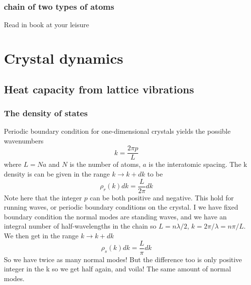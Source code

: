 \documentclass[11pt]{article}
\begin{document}
\subsubsection{chain of two types of atoms}
Read in book at your leisure

\section{Crystal dynamics}
\subsection{Heat capacity from lattice vibrations}
\subsubsection{The density of states}
Periodic boundary condition for one-dimensional crystals yields the possible wavenumbers
\begin{equation}
	k = \frac{2 \pi p}{L}
\end{equation}
where $L = Na$ and $N$ is the number of atoms, $a$ is the interatomic spacing. The k density is can be given in the range $k \to k+dk$ to be
\begin{equation}
	\rho_r(k) dk = \frac{L}{2\pi} dk
\end{equation}
Note here that the integer $p$ can be both positive and negative. This hold for running waves, or periodic boundary conditions on the crystal. I we have fixed boundary condition the normal modes are standing waves, and we have an integral number of half-wavelengths in the chain so $L = n \lambda /2$, $k=2\pi/\lambda = n \pi/L$.  We then get in the range $k \to k +dk$
\begin{equation}
	\rho_s(k) dk  = \frac{L}{\pi} dk
\end{equation}
So we have twice as many normal modes!  But the difference too is only positive integer in the k so we get half again, and voila! The same amount of normal modes.
\end{document}
